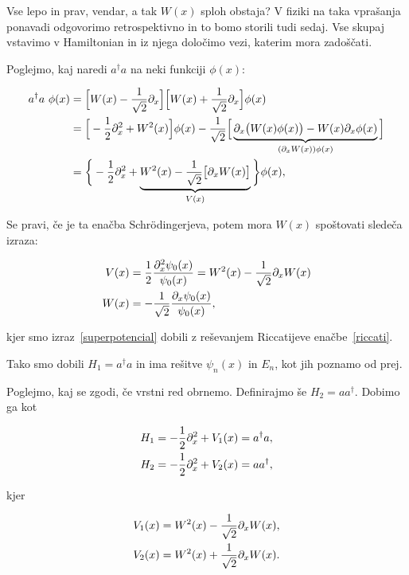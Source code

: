 Vse lepo in prav, vendar, a tak $W (x)$ sploh obstaja? V fiziki na taka vpra\v sanja ponavadi odgovorimo
retrospektivno in to bomo storili tudi sedaj. Vse skupaj vstavimo v Hamiltonian in iz njega dolo\v cimo
vezi, katerim mora zado\v s\v cati.

Poglejmo, kaj naredi $a^\dagger a$ na neki funkciji $\phi (x)$:

\begin{align}
	a^\dagger a\ \phi(x)&= \Big[W(x) - \frac{1}{\sqrt{2}}\partial_x\Big]\Big[W(x) +
		\frac{1}{\sqrt{2}}\partial_x\Big]\phi(x) \notag \\
	&= \Big[-\frac{1}{2}\partial_x^2 + W^2(x)\Big]\phi(x) - \frac{1}{\sqrt{2}}\Big[
		\underbrace{\partial_x \big(W(x)\phi(x)\big) - W(x)\partial_x\phi(x)}_{(\partial_x W(x))\phi(x)} \Big] \notag \\
	&= \bigg\{-\frac{1}{2}\partial_x^2 +
		\underbrace{W^2(x) - \frac{1}{\sqrt{2}}\big[\partial_x W(x)\big]}_{V(x)}\bigg\}\phi(x),
	\label{dokaz.aad}
\end{align}

Se pravi, \v ce je ta ena\v cba Schr\" odingerjeva, potem mora $W (x)$ spo\v stovati slede\v ca izraza:

\begin{align}
	V(x) &=\frac{1}{2}\frac{\partial_x^2\psi_0(x)}{\psi_0(x)} = W^2(x) - \frac{1}{\sqrt{2}}\partial_x
		W(x) \label{riccati} \\
	W(x) &= -\frac{1}{\sqrt{2}}\frac{\partial_x\psi_0(x)}{\psi_0(x)} \label{superpotencial},
\end{align}

kjer smo izraz~\eqref{superpotencial} dobili z re\v sevanjem Riccatijeve ena\v cbe~\eqref{riccati}.

Tako smo dobili $H_1 = a^\dagger a$ in ima re\v sitve $\psi_n(x)$ in $E_n$, kot jih poznamo
od prej.

Poglejmo, kaj se zgodi, \v ce vrstni red obrnemo. Definirajmo \v se $H_2 = aa^\dagger$. Dobimo ga kot

\begin{align}
	H_1 &= -\frac{1}{2}\partial_x^2 + V_1(x) = a^\dagger a, \\
	H_2 &= -\frac{1}{2}\partial_x^2 + V_2(x) = aa^\dagger,
\end{align}

kjer

\begin{align}
	V_1(x) &= W^2(x) - \frac{1}{\sqrt{2}}\partial_x W(x), \notag \\
	V_2(x) &= W^2(x) + \frac{1}{\sqrt{2}}\partial_x W(x). \label{v2pot}
\end{align}

